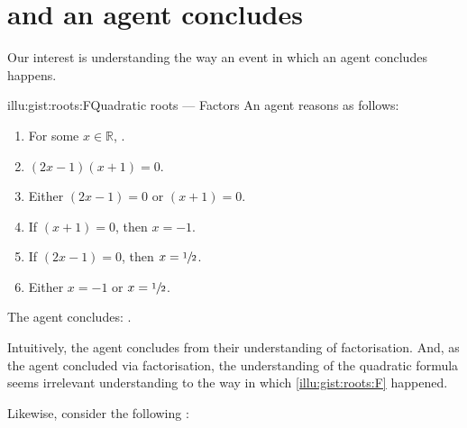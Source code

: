 \chapter{\qWhy{} and \qHow{} an agent concludes}
\label{cha:intro}


\begin{note}
  Our interest is understanding the way an event in which an agent concludes happens.

  \begin{rscenario}{illu:gist:roots:F}{Quadratic roots --- Factors}%
    An agent reasons as follows:
    \begin{enumerate}[label=\arabic*., ref=\arabic*]
    \item
      \label{illu:gist:roots:F:eq}
      For some \(x \in \mathbb{R}\), \rootsConEq{}.
    \item
      \label{illu:gist:roots:F:factor}
      \((2x - 1)(x + 1) = 0\).
    \item
      \label{illu:gist:roots:F:zero}
      Either \((2x - 1) = 0\) or \((x + 1) = 0\).
    \item
      \label{illu:gist:roots:F:case:a}
      If \((x + 1) = 0\), then \(x = -1\).
    \item
      \label{illu:gist:roots:F:case:b}
      If \((2x - 1) = 0\), then \(x = \sfrac{1}{2}\).
    \item
      \label{illu:gist:roots:F:factor:done}
      Either \(x = -1\) or \(x = \sfrac{1}{2}\).
    \end{enumerate}
    The agent concludes:
    \rootsCon{}.
  \end{rscenario}

  \noindent%
  Intuitively, the agent concludes \propI{\rootsCon{}} from their understanding of factorisation.
  And, as the agent concluded via factorisation, the \agents{} understanding of the quadratic formula seems irrelevant understanding to the way in which \autoref{illu:gist:roots:F} happened.

  Likewise, consider the following :


\end{note}
